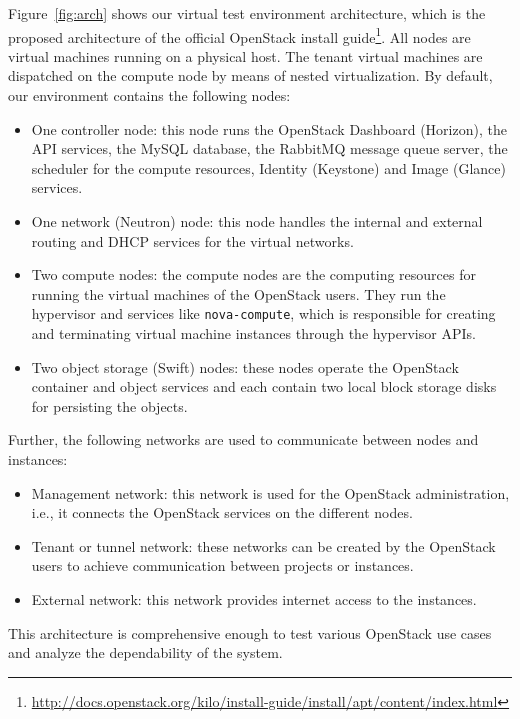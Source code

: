 Figure~\ref{fig:arch} shows our virtual test environment architecture, which is the proposed architecture of the official OpenStack install guide\footnote{\url{http://docs.openstack.org/kilo/install-guide/install/apt/content/index.html}}. All nodes are virtual machines running on a physical host. The tenant virtual machines are dispatched on the compute node by means of nested virtualization. By default, our environment contains the following nodes:
\begin{itemize}
	\item One controller node: this node runs the OpenStack Dashboard (Horizon), the API services, the MySQL database, the RabbitMQ message queue server, the scheduler for the compute resources, Identity (Keystone) and Image (Glance) services.
	\item One network (Neutron) node: this node handles the internal and external routing and DHCP services for the virtual networks.
	\item Two compute nodes: the compute nodes are the computing resources for running the virtual machines of the OpenStack users. They run the hypervisor and services like \verb|nova-compute|, which is responsible for creating and terminating virtual machine instances through the hypervisor APIs.
	\item Two object storage (Swift) nodes: these nodes operate the OpenStack container and object services and each contain two local block storage disks for persisting the objects.
\end{itemize}

Further, the following networks are used to communicate between nodes and instances:
\begin{itemize}
	\item Management network: this network is used for the OpenStack administration, i.e., it connects the OpenStack services on the different nodes. 
	\item Tenant or tunnel network: these networks can be created by the OpenStack users to achieve communication between projects or instances. 
	\item External network: this network provides internet access to the instances.
\end{itemize}

This architecture is comprehensive enough to test various OpenStack use cases and analyze the dependability of the system.\\

